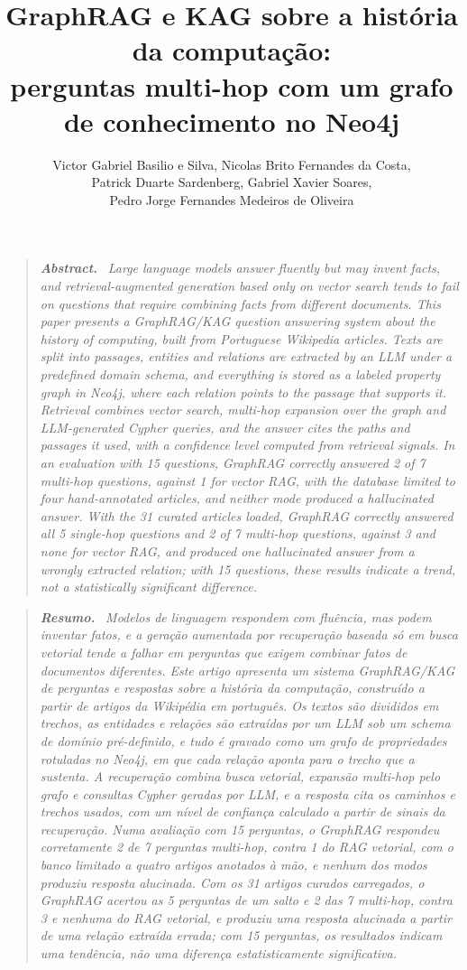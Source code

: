 \documentclass[12pt]{article}
\title{GraphRAG e KAG sobre a história da computação:\\
perguntas multi-hop com um grafo de conhecimento no Neo4j}
\author{Victor Gabriel Basilio e Silva\inst{1}, Nicolas Brito Fernandes da Costa\inst{1},\\
Patrick Duarte Sardenberg\inst{1}, Gabriel Xavier Soares\inst{1},\\
Pedro Jorge Fernandes Medeiros de Oliveira\inst{1}}
\makeatletter
\renewcommand{\maketitle}{%
    \begin{center}
      {\Large\bfseries \@title\par}\vspace{1em}
      {\bfseries \@author\par}\vspace{0.6em}
      {\small \enderecoautores\par}
    \end{center}\vspace{1em}}
\renewenvironment{abstract}{\begin{quote}\small\textbf{\textit{Abstract.}}~\itshape}{\end{quote}}
\newenvironment{resumo}{\begin{quote}\small\textbf{\textit{Resumo.}}~\itshape}{\end{quote}}
\makeatother
\begin{document}
\maketitle

\begin{abstract}
Large language models answer fluently but may invent facts, and retrieval-augmented
generation based only on vector search tends to fail on questions that require
combining facts from different documents. This paper presents a GraphRAG/KAG question
answering system about the history of computing, built from Portuguese Wikipedia
articles. Texts are split into passages, entities and relations are extracted by an
LLM under a predefined domain schema, and everything is stored as a labeled property
graph in Neo4j, where each relation points to the passage that supports it. Retrieval
combines vector search, multi-hop expansion over the graph and LLM-generated Cypher
queries, and the answer cites the paths and passages it used, with a confidence level
computed from retrieval signals. In an evaluation with 15 questions, GraphRAG correctly
answered 2 of 7 multi-hop questions, against 1 for vector RAG, with the database
limited to four hand-annotated articles, and neither mode produced a hallucinated answer.
With the 31 curated articles loaded, GraphRAG correctly answered all 5 single-hop
questions and 2 of 7 multi-hop questions, against 3 and none for vector RAG, and produced
one hallucinated answer from a wrongly extracted relation; with 15 questions, these
results indicate a trend, not a statistically significant difference.
\end{abstract}

\begin{resumo}
Modelos de linguagem respondem com fluência, mas podem inventar fatos, e a geração
aumentada por recuperação baseada só em busca vetorial tende a falhar em perguntas que
exigem combinar fatos de documentos diferentes. Este artigo apresenta um sistema
GraphRAG/KAG de perguntas e respostas sobre a história da computação, construído a
partir de artigos da Wikipédia em português. Os textos são divididos em trechos, as
entidades e relações são extraídas por um LLM sob um schema de domínio pré-definido, e
tudo é gravado como um grafo de propriedades rotuladas no Neo4j, em que cada relação
aponta para o trecho que a sustenta. A recuperação combina busca vetorial, expansão
multi-hop pelo grafo e consultas Cypher geradas por LLM, e a resposta cita os caminhos e
trechos usados, com um nível de confiança calculado a partir de sinais da recuperação.
Numa avaliação com 15 perguntas, o GraphRAG respondeu corretamente 2 de 7 perguntas
multi-hop, contra 1 do RAG vetorial, com o banco limitado a quatro artigos anotados à
mão, e nenhum dos modos produziu resposta alucinada. Com os 31 artigos curados
carregados, o GraphRAG acertou as 5 perguntas de um salto e 2 das 7 multi-hop, contra 3 e
nenhuma do RAG vetorial, e produziu uma resposta alucinada a partir de uma relação
extraída errada; com 15 perguntas, os resultados indicam uma tendência, não uma diferença
estatisticamente significativa.
\end{resumo}
\end{document}
